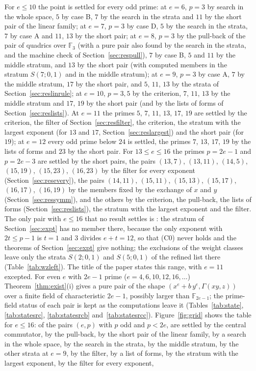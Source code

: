 \documentclass[11pt]{article}
\theoremstyle{definition}
\theoremstyle{remark}
\newcommand{\F}{\mathbb{F}}
\begin{document}
For $e\le10$ the point is settled for every odd prime: at $e=6$, $p=3$ by search in the whole space, $5$ by case B, $7$ by the search in the strata and $11$ by the short pair of the linear family; at $e=7$, $p=3$ by case D, $5$ by the search in the strata, $7$ by case A and $11$, $13$ by the short pair; at $e=8$, $p=3$ by the pull-back of the pair of quadrics over $\F_3$ (with a pure pair also found by the search in the strata, and the machine check of Section~\ref{sec:respull}), $7$ by case B, $5$ and $11$ by the middle stratum, and $13$ by the short pair (with computed members in the stratum $S(7;0,1)$ and in the middle stratum); at $e=9$, $p=3$ by case A, $7$ by the middle stratum, $17$ by the short pair, and $5$, $11$, $13$ by the strata of Section~\ref{sec:reslinrule}; at $e=10$, $p=3,5$ by the criterion, $7$, $11$, $13$ by the middle stratum and $17$, $19$ by the short pair (and by the lists of forms of Section~\ref{sec:reslists}). At $e=11$ the primes $5$, $7$, $11$, $13$, $17$, $19$ are settled by the criterion, the filter of Section~\ref{sec:resfilter}, the criterion, the stratum with the largest exponent (for $13$ and $17$, Section~\ref{sec:reslargest}) and the short pair (for $19$); at $e=12$ every odd prime below $24$ is settled, the primes $7$, $13$, $17$, $19$ by the lists of forms and $23$ by the short pair. For $13\le e\le16$ the primes $p=2e-1$ and $p=2e-3$ are settled by the short pairs, the pairs $(13,7)$, $(13,11)$, $(14,5)$, $(15,19)$, $(15,23)$, $(16,23)$ by the filter for every exponent (Section~\ref{sec:resevery}), the pairs $(14,11)$, $(15,11)$, $(15,13)$, $(15,17)$, $(16,17)$, $(16,19)$ by the members fixed by the exchange of $x$ and $y$ (Section~\ref{sec:ressymm}), and the others by the criterion, the pull-back, the lists of forms (Section~\ref{sec:reslists}), the stratum with the largest exponent and the filter. The only pair with $e\le16$ that no result settles is \ngridOpenListSixteen{}: the stratum of Section~\ref{sec:expt} has no member there, because the only exponent with $2t\le p-1$ is $t=1$ and $3$ divides $e+t=12$, so that (C0) never holds and the theorems of Section~\ref{sec:expt} give nothing; the exclusions of the weight classes leave only the strata $S(2;0,1)$ and $S(5;0,1)$ of the refined list there (Table~\ref{tab:wzleft}). The title of the paper states this range, with $e=11$ excepted. For even $e$ with $2e-1$ prime ($e=4,6,10,12,16,\dots$) Theorem~\ref{thm:exist}(i) gives a pure pair of the shape $(x^e+b\,y^e,\Gamma(xy,z))$ over a finite field of characteristic $2e-1$, possibly larger than $\F_{2e-1}$; the prime-field status of each pair is kept as the computations leave it (Tables~\ref{tab:state}, \ref{tab:statesrc}, \ref{tab:statesrcb} and~\ref{tab:statesrcc}). Figure~\ref{fig:grid} shows the table for $e\le16$: of the \ngridCells{} pairs $(e,p)$ with $p$ odd and $p<2e$, \ngridByC{} are settled by the central commutator, \ngridByP{} by the pull-back, \ngridByL{} by the short pair of the linear family, \ngridByS{} by a search in the whole space, \ngridByW{} by the search in the strata, \ngridByM{} by the middle stratum, \ngridByO{} by the other strata at $e=9$, \ngridByF{} by the filter, \ngridByG{} by a list of forms, \ngridByH{} by the stratum with the largest exponent, \ngridByE{} by the filter for every exponent, \ngridByX{} 
\end{document}
